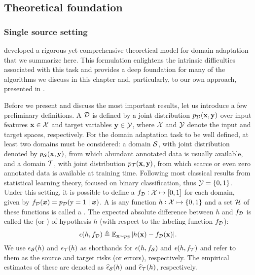 \subsection{Theoretical foundation}
\label{sec:da_theory}

\subsubsection{Single source setting}
\label{sec:da_theory_ss}
\citet{BenDavid2010} developed a rigorous yet comprehensive theoretical model for domain adaptation that we summarize here. This formulation enlightens the intrinsic difficulties associated with this task and provides a deep foundation for many of the algorithms we discuss in this chapter and, particularly, to our own approach, presented in .

Before we present and discuss the most important results, let us introduce a few preliminary definitions. A  ${\mathcal{D}}$ is defined by a joint distribution $p_{\mathcal{D}}({\mathbf{x}}, {\mathbf{y}})$ over input features ${\mathbf{x}} \in {\mathcal{X}}$ and target variables ${\mathbf{y}} \in {\mathcal{Y}}$, where ${\mathcal{X}}$ and ${\mathcal{Y}}$ denote the input and target spaces, respectively. For the domain adaptation task to be well defined, at least two domains must be considered: a  domain ${\mathcal{S}}$, with joint distribution denoted by $p_{\mathcal{S}}({\mathbf{x}}, {\mathbf{y}})$, from which abundant annotated data is usually available, and a  domain ${\mathcal{T}}$, with joint distribution $p_{\mathcal{T}}({\mathbf{x}}, {\mathbf{y}})$, from which scarce or even zero annotated data is available at training time. Following most classical results from statistical learning theory, \citet{BenDavid2010} focused on binary classification, thus ${\mathcal{Y}} = \{0, 1\}$. Under this setting, it is possible to define a  $f_{\mathcal{D}}: {\mathcal{X}} \mapsto [0, 1]$ for each domain, given by $f_{\mathcal{D}}({\bm{x}}) = p_{\mathcal{D}}({\textnormal{y}}=1 \mid {\bm{x}})$. A  is any function $h: {\mathcal{X}} \mapsto \{0,1\}$ and a set ${\mathcal{H}}$ of these functions is called a . The expected absolute difference between $h$ and $f_{\mathcal{D}}$ is called the  (or ) of hypothesis $h$ (with respect to the labeling function $f_{\mathcal{D}}$):
\begin{equation}
	\label{eq:risk}
	\epsilon(h,f_{\mathcal{D}}) \triangleq \mathbb{E}_{{\mathbf{x}} \sim p_{\mathcal{D}}} |h({\mathbf{x}}) - f_{\mathcal{D}}({\mathbf{x}})|.
\end{equation}
We use $\epsilon_{\mathcal{S}}(h)$ and $\epsilon_{\mathcal{T}}(h)$ as shorthands for $\epsilon(h,f_{\mathcal{S}})$ and $\epsilon(h,f_{\mathcal{T}})$ and refer to them as the source and target risks (or errors), respectively. The empirical estimates of these are denoted as $\widehat{\epsilon}_{\mathcal{S}}(h)$ and $\widehat{\epsilon}_{\mathcal{T}}(h)$, respectively.

